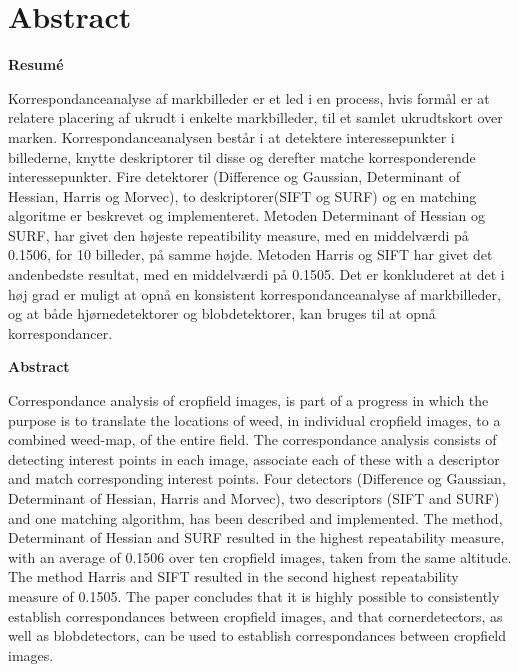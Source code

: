\chapter{Abstract} \label{sec:abstract}
\vspace{2cm}
\begin{center}
\textbf{Resumé}
\end{center}
Korrespondanceanalyse af markbilleder er et led i en process, hvis formål er at relatere placering af ukrudt i enkelte markbilleder,
til et samlet ukrudtskort over marken. Korrespondanceanalysen består i at detektere interessepunkter i billederne, knytte deskriptorer til disse og derefter matche korresponderende interessepunkter. Fire detektorer (Difference og Gaussian, Determinant of Hessian, Harris og Morvec), to deskriptorer(SIFT og SURF) og en matching algoritme er beskrevet og implementeret. Metoden Determinant of Hessian og SURF, har givet den højeste repeatibility measure, med en middelværdi på 0.1506, for 10 billeder, på samme højde. Metoden Harris og SIFT har givet det andenbedste resultat, med en middelværdi på 0.1505. Det er konkluderet at det i høj grad er muligt at opnå en konsistent korrespondanceanalyse af markbilleder, og at både hjørnedetektorer og blobdetektorer, kan bruges til at opnå korrespondancer.
\vspace{2cm}
\begin{center}
\textbf{Abstract}
\end{center}
Correspondance analysis of cropfield images, is part of a progress in which the purpose is to translate the locations of weed, in individual cropfield images, to a combined weed-map, of the entire field. The correspondance analysis consists of detecting interest points in each image, associate each of these with a descriptor and match corresponding interest points. Four detectors (Difference og Gaussian, Determinant of Hessian, Harris and Morvec), two descriptors (SIFT and SURF) and one matching algorithm, has been described and implemented. The method, Determinant of Hessian and SURF resulted in the highest repeatability measure, with an average of 0.1506 over ten cropfield images, taken from the same altitude. The method Harris and SIFT resulted in the second highest repeatability measure of 0.1505. The paper concludes that it is highly possible to consistently establish correspondances between cropfield images, and that cornerdetectors, as well as blobdetectors, can be used to establish correspondances between cropfield images.